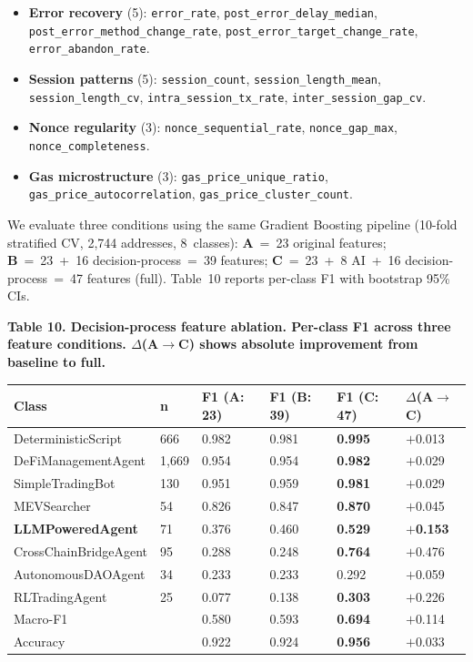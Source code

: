 \documentclass[sigconf,nonacm=false]{acmart}
\begin{document}
\begin{itemize}
\item \textbf{Error recovery} (5): \texttt{error\_rate}, \texttt{post\_error\_delay\_median}, \texttt{post\_error\_method\_change\_rate}, \texttt{post\_error\_target\_change\_rate}, \texttt{error\_abandon\_rate}.
\item \textbf{Session patterns} (5): \texttt{session\_count}, \texttt{session\_length\_mean}, \texttt{session\_length\_cv}, \texttt{intra\_session\_tx\_rate}, \texttt{inter\_session\_gap\_cv}.
\item \textbf{Nonce regularity} (3): \texttt{nonce\_sequential\_rate}, \texttt{nonce\_gap\_max}, \texttt{nonce\_completeness}.
\item \textbf{Gas microstructure} (3): \texttt{gas\_price\_unique\_ratio}, \texttt{gas\_price\_autocorrelation}, \texttt{gas\_price\_cluster\_count}.
\end{itemize}

We evaluate three conditions using the same Gradient Boosting pipeline (10-fold stratified CV, 2,744 addresses, 8~classes): \textbf{A}~=~23 original features; \textbf{B}~=~23~+~16 decision-process~=~39 features; \textbf{C}~=~23~+~8 AI~+~16 decision-process~=~47 features (full). Table~10 reports per-class F1 with bootstrap 95\% CIs.

\textbf{Table 10. Decision-process feature ablation. Per-class F1 across three feature conditions. $\Delta$(A$\to$C) shows absolute improvement from baseline to full.}

\begin{table}[h]
\centering
\small
\begin{tabular}{llllll}
\toprule
Class & n & F1 (A: 23) & F1 (B: 39) & F1 (C: 47) & $\Delta$(A$\to$C) \\
\midrule
DeterministicScript & 666 & 0.982 & 0.981 & \textbf{0.995} & $+$0.013 \\
DeFiManagementAgent & 1,669 & 0.954 & 0.954 & \textbf{0.982} & $+$0.029 \\
SimpleTradingBot & 130 & 0.951 & 0.959 & \textbf{0.981} & $+$0.029 \\
MEVSearcher & 54 & 0.826 & 0.847 & \textbf{0.870} & $+$0.045 \\
\textbf{LLMPoweredAgent} & 71 & 0.376 & 0.460 & \textbf{0.529} & $+$\textbf{0.153} \\
CrossChainBridgeAgent & 95 & 0.288 & 0.248 & \textbf{0.764} & $+$0.476 \\
AutonomousDAOAgent & 34 & 0.233 & 0.233 & 0.292 & $+$0.059 \\
RLTradingAgent & 25 & 0.077 & 0.138 & \textbf{0.303} & $+$0.226 \\
\midrule
Macro-F1 & & 0.580 & 0.593 & \textbf{0.694} & $+$0.114 \\
Accuracy & & 0.922 & 0.924 & \textbf{0.956} & $+$0.033 \\
\bottomrule
\end{tabular}
\end{table}
\end{document}
